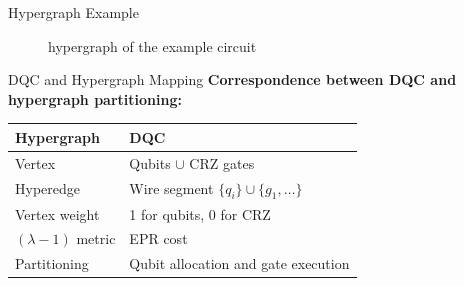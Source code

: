 \documentclass{beamer}
\begin{document}
\begin{frame}{Hypergraph Example}
\begin{minipage}{0.48\linewidth}
\begin{figure}
				\caption{hypergraph of the example circuit}
			\end{figure}
		\end{minipage}
	\end{frame}
	
	\begin{frame}{DQC and Hypergraph Mapping}
		\textbf{Correspondence between DQC and hypergraph partitioning:}
		\begin{center}
			\begin{tabular}{ll}
				\toprule
				\textbf{Hypergraph} & \textbf{DQC} \\
				\midrule
				Vertex & Qubits $\cup$ CRZ gates \\
				Hyperedge & Wire segment $\{q_i\} \cup \{g_1, \dots\}$ \\
				Vertex weight & 1 for qubits, 0 for CRZ \\
				$(\lambda - 1)$ metric & EPR cost \\
				Partitioning & Qubit allocation and gate execution \\
				\bottomrule
			\end{tabular}
		\end{center}
	\end{frame}
	
\end{document}
